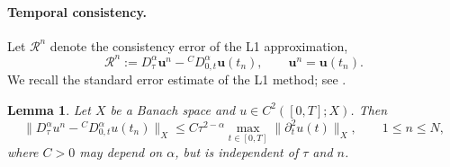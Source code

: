 \documentclass[11pt,a4paper]{article}
\numberwithin{equation}{section}
\theoremstyle{plain}
\newtheorem{lemma}[theorem]{Lemma}
\theoremstyle{definition}
\theoremstyle{remark}
\newtheorem{remark}[theorem]{Remark}
\newcommand{\CD}{{}^{C}\!D_{0,t}^{\alpha}}   %
\newcommand{\nrm}[1]{|||#1|||_h}      %
\newcommand{\Dt}{D_\tau^{\alpha}}     %
\begin{document}

\paragraph{Temporal consistency.}
Let $\mathcal R^n$ denote the consistency error
of the L1 approximation,
\[
\mathcal R^n
:=\Dt\bm u^n-\CD\bm u(t_n),
\qquad
\bm u^n=\bm u(t_n).
\]
We recall the standard error estimate of the L1 method; see \cite{LX}.

\begin{lemma}
\label{lem:cons}
Let $X$ be a Banach space and
$u\in C^2([0,T];X)$. Then
\[
\|\Dt u^n-\CD u(t_n)\|_X
\le
C\tau^{2-\alpha}
\max_{t\in[0,T]}
\|\partial_t^2 u(t)\|_X,
\qquad 1\le n\le N,
\]
where $C>0$ may depend on $\alpha$, but is
independent of $\tau$ and $n$.
\end{lemma}

\end{document}
